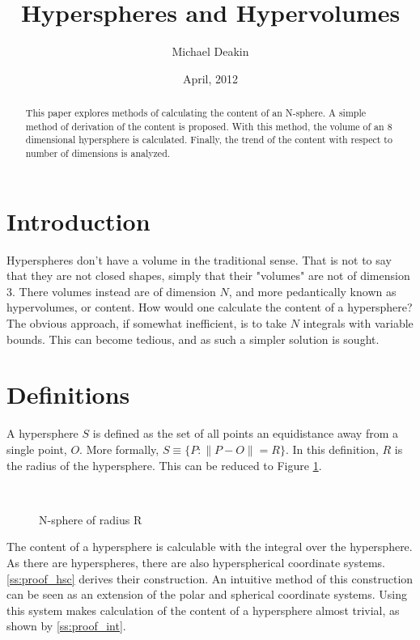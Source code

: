\documentclass [letterpaper]{article}
\author{Michael Deakin}
\title{Hyperspheres and Hypervolumes}
\date{April, 2012}
\begin{document}
\maketitle
\begin{abstract}
This paper explores methods of calculating the content of an N-sphere.  A simple method of derivation of the content is proposed. With this method, the volume of an 8 dimensional hypersphere is calculated. Finally, the trend of the content with respect to number of dimensions is analyzed.
\end{abstract}
\section{Introduction}
Hyperspheres don't have a volume in the traditional sense. That is not to say that they are not closed shapes, simply that their "volumes" are not of dimension 3. There volumes instead are of dimension $N$, and more pedantically known as hypervolumes, or content. How would one calculate the content of a hypersphere? The obvious approach, if somewhat inefficient, is to take $N$ integrals with variable bounds. This can become tedious, and as such a simpler solution is sought.
\section{Definitions}
A hypersphere $S$ is defined as the set of all points an equidistance away from a single point, $O$. More formally, $S\equiv \{P : \|P-O\|=R\}$. In this definition, $R$ is the radius of the hypersphere. This can be reduced to Figure \ref{fig:eq1}.
\begin{figure}[h]
~\cite{mathworld}
\caption{\label{fig:eq1}N-sphere of radius R}
\end{figure}
The content of a hypersphere is calculable with the integral over the hypersphere. As there are hyperspheres, there are also hyperspherical coordinate systems. \ref{ss:proof_hsc} derives their construction. An intuitive method of this construction can be seen as an extension of the polar and spherical coordinate systems. Using this system makes calculation of the content of a hypersphere almost trivial, as shown by \ref{ss:proof_int}.
\end{document}
